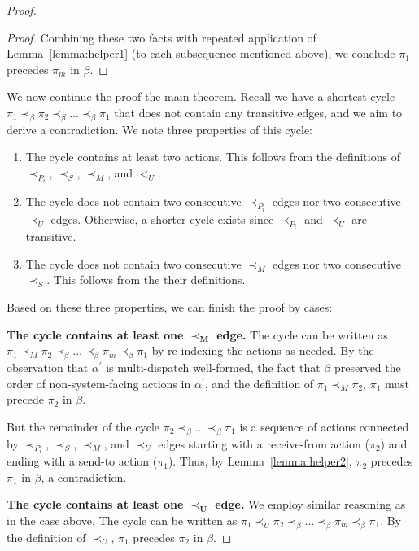 \begin{proof}
\begin{proof}
      Combining these two facts with repeated application of Lemma~\ref{lemma:helper1} (to each subsequence mentioned above), we conclude $\pi_1$ precedes $\pi_m$ in $\beta$.
  \end{proof}

  We now continue the proof the main theorem. Recall we have a shortest cycle
  $\pi_1 \prec_\beta \pi_2 \prec_\beta \ldots \prec_\beta \pi_1$ that does not contain any transitive edges,
  and we aim to derive a contradiction. We note three properties of this cycle: 
  \begin{enumerate}
      \item The cycle contains at least two actions. This follows from the definitions of $\prec_{P_i}$, $\prec_S$, $\prec_M$, and $<_U$.
      \item The cycle does not contain two consecutive $\prec_{P_i}$ edges nor two consecutive $\prec_U$ edges. Otherwise, a shorter cycle exists since $\prec_{P_i}$ and $\prec_U$ are transitive.
      \item The cycle does not contain two consecutive $\prec_M$ edges nor two consecutive $\prec_S$. This follows from the their definitions.
  \end{enumerate}
  Based on these three properties, we can finish the proof by cases:

  \noindent \textbf{The cycle contains at least one $\mathbf{\prec_M}$ edge.}
  The cycle can be written as $\pi_1 \prec_M \pi_2 \prec_\beta \ldots \prec_\beta \pi_m \prec_\beta \pi_1$ by re-indexing the actions as needed. By the observation that $\alpha^\prime$ is multi-dispatch well-formed, the fact that $\beta$ preserved the order of non-system-facing actions in $\alpha^\prime$, and the definition of $\pi_1 \prec_M \pi_2$, $\pi_1$ must precede $\pi_2$ in $\beta$.

  But the remainder of the cycle $\pi_2 \prec_\beta \ldots \prec_\beta \pi_1$ is a sequence of actions connected by $\prec_{P_i}$, $\prec_S$, $\prec_M$, and $\prec_U$ edges starting with a receive-from action ($\pi_2$) and ending with a send-to action ($\pi_1$). Thus, by Lemma~\ref{lemma:helper2}, $\pi_2$ precedes $\pi_1$ in $\beta$, a contradiction.

  \noindent \textbf{The cycle contains at least one $\mathbf{\prec_U}$ edge.}
  We employ similar reasoning as in the case above. The cycle can be written as $\pi_1 \prec_U \pi_2 \prec_\beta \ldots \prec_\beta \pi_m \prec_\beta \pi_1$. By the definition of $\prec_U$, $\pi_1$ precedes $\pi_2$ in $\beta$.


\end{proof}
